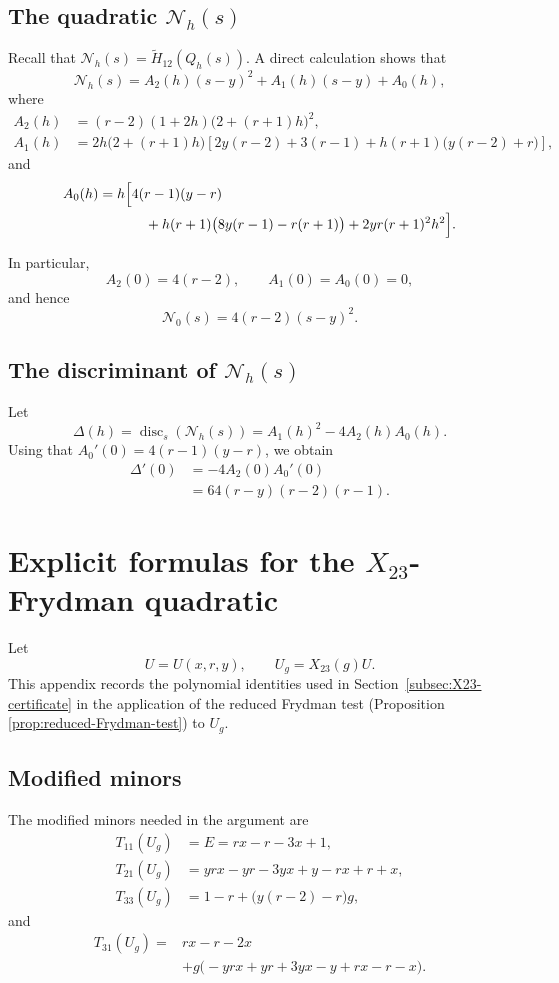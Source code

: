 \documentclass[11pt,onecolumn]{amsart}
\theoremstyle{plain}
\theoremstyle{definition}
\theoremstyle{remark}
\newcommand{\disc}{\operatorname{disc}}
\begin{document}
\subsection*{The quadratic $\mathcal N_h(s)$}
Recall that  $\mathcal N_h(s)=\widetilde H_{12}(Q_h(s))$.
A direct calculation shows that
\[
\mathcal N_h(s)
=A_2(h)(s-y)^2+A_1(h)(s-y)+A_0(h),
\]
where
\begin{align*}
A_2(h) &=(r-2)(1+2h)\bigl(2+(r+1)h\bigr)^2,\\
A_1(h) &= 2h\bigl(2+(r+1)h\bigr)
\left[
2y(r-2)+3(r-1)
+h(r+1)\bigl(y(r-2)+r\bigr)
\right],
\end{align*}
and
\[
\begin{aligned}
	A_0(h)
	={}&h\Bigl[
	4(r-1)(y-r)\\
	&\qquad
	+h(r+1)\bigl(8y(r-1)-r(r+1)\bigr)
	+2yr(r+1)^2h^2
	\Bigr].
\end{aligned}
\]

In particular,
\[
A_2(0)=4(r-2),
\qquad
A_1(0)=A_0(0)=0,
\]
and hence
\[
\mathcal N_0(s)=4(r-2)(s-y)^2.
\]

\subsection*{The discriminant of $\mathcal N_h(s)$}
Let
\[
\Delta(h)=\disc_s(\mathcal N_h(s))
=A_1(h)^2-4A_2(h)A_0(h).
\]
Using that $A_0'(0)=4(r-1)(y-r)$,
we obtain
\[
\begin{aligned}
	\Delta'(0)
	&=-4A_2(0)A_0'(0)\\
	&=64(r-y)(r-2)(r-1).
\end{aligned}
\]





\section{Explicit formulas for the \texorpdfstring{$X_{23}$}{X23}-Frydman quadratic}
\label{app:X23-Frydman-formulas}

Let
\[
U=U(x,r,y),\qquad U_g=X_{23}(g)U.
\]
This appendix records the polynomial identities used in
Section~\ref{subsec:X23-certificate} in the application of the reduced Frydman test (Proposition \ref{prop:reduced-Frydman-test}) to $U_g$. 



\subsection*{Modified minors}
The modified minors needed in the argument are
\begin{align*}
T_{11}(U_g) &=E=rx-r-3x+1,\\
T_{21}(U_g) &=yrx-yr-3yx+y-rx+r+x,\\
T_{33}(U_g) &=1-r+\bigl(y(r-2)-r\bigr)g,
\end{align*}
and
\[
\begin{aligned}
T_{31}(U_g)={}&rx-r-2x\\
&+g\bigl(-yrx+yr+3yx-y+rx-r-x\bigr).
\end{aligned}
\]
\end{document}
